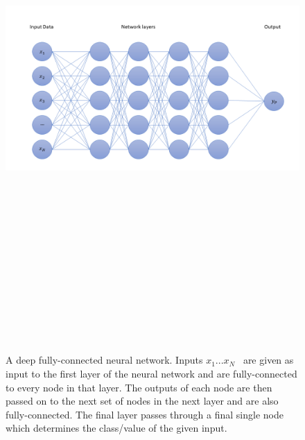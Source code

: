 %
\begin{figure}
    \centering
    \includegraphics[width=17cm,height=20cm,keepaspectratio]{figures/DeepFullyConnectedNetwork.png}
    \caption[Deep fully-connected neural network illustration.]{A deep fully-connected neural network. Inputs $x_1 ... x_N$~ are given as input to the first layer of the neural network and are fully-connected to every node in that layer. The outputs 
    of each node are then passed on to the next set of nodes in the next layer and are also fully-connected. The final layer passes through a final single node which determines the class/value of the given input.~}
    \label{fig:deep_nn}
\end{figure}
%
%

